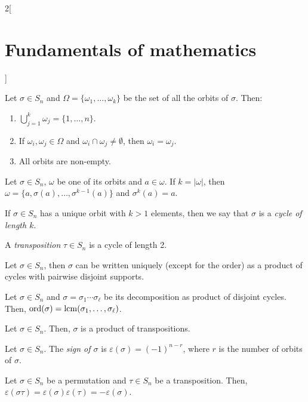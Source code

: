 \documentclass[../../../main.tex]{subfiles}
\begin{document}
\begin{multicols}{2}[\section{Fundamentals of mathematics}]
\begin{theorem}
    Let $\sigma\in S_n$ and $\Omega=\{\omega_1,\ldots,\omega_k\}$ be the set of all the orbits of $\sigma$. Then:
    \begin{enumerate}
        \item $\bigcup_{j=1}^k \omega_j=\{1,\ldots,n\}$.
        \item If $\omega_i,\omega_j\in\Omega$ and $\omega_i\cap\omega_j\ne\emptyset$, then $\omega_i=\omega_j$.
        \item All orbits are non-empty.
    \end{enumerate}
\end{theorem}
\begin{theorem}
    Let $\sigma\in S_n$, $\omega$ be one of its orbits and $a\in\omega$. If $k=|\omega|$, then $\omega=\{a,\sigma(a),\ldots,\sigma^{k-1}(a)\}$ and $\sigma^k(a)=a$.
\end{theorem}
\begin{definition}
    If $\sigma\in S_n$ has a unique orbit with $k>1$ elements, then we say that $\sigma$ is a \textit{cycle of length $k$}. 
\end{definition}
\begin{definition}
    A \textit{transposition} $\tau\in S_n$ is a cycle of length 2.
\end{definition}
\begin{theorem}
    Let $\sigma\in S_n$, then $\sigma$ can be written uniquely (except for the order) as a product of cycles with pairwise disjoint supports.
\end{theorem}
\begin{corollary}
    Let $\sigma\in S_n$ and $\sigma=\sigma_1\cdots\sigma_\ell$ be its decomposition as product of disjoint cycles. Then, $\text{ord}(\sigma)=\operatorname{lcm}(\sigma_1,\ldots,\sigma_\ell)$.
\end{corollary}
\begin{corollary}
    Let $\sigma\in S_n$. Then, $\sigma$ is a product of transpositions.
\end{corollary}
\begin{definition}
    Let $\sigma\in S_n$. The \textit{sign of $\sigma$} is $\varepsilon(\sigma)=(-1)^{n-r}$, where $r$ is the number of orbits of $\sigma$.
\end{definition}
\begin{theorem}
    Let $\sigma\in S_n$ be a permutation and $\tau\in S_n$ be a transposition. Then, $\varepsilon(\sigma\tau)=\varepsilon(\sigma)\varepsilon(\tau)=-\varepsilon(\sigma)$.

\end{theorem}
\end{multicols}
\end{document}
